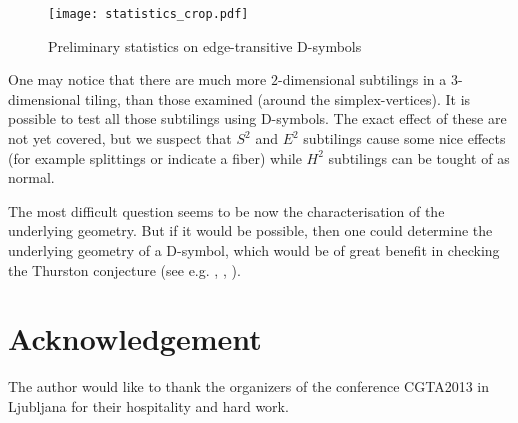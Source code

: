 \documentclass[12pt,a4paper]{article}
\numberwithin{equation}{section}
\theoremstyle{plain}%
\theoremstyle{definition}
\theoremstyle{remark}
\begin{document}
\begin{figure}
  \caption{\label{fig:stat} Preliminary statistics on edge-transitive D-symbols}
  \center
  \texttt{[image: statistics\_crop.pdf]}
\end{figure}


One may notice that there are much more $2$-dimensional subtilings in a
$3$-dimensional tiling, than those examined (around the simplex-vertices). It
is possible to test all those subtilings using D-symbols. The exact
effect of these are not yet covered, but we suspect that $S^2$ and $E^2$
subtilings cause some nice effects (for example splittings or indicate a fiber)
while $H^2$ subtilings can be tought of as normal.

The most difficult question seems to be now the characterisation of
the underlying geometry. But if it would be possible, then one could determine
the underlying geometry of a D-symbol, which would be of great benefit in checking
the Thurston conjecture (see e.g. \cite{Du88}, \cite{M11}, \cite{T82}).

\section{Acknowledgement}
The author would like to thank the organizers of the conference CGTA2013 in
Ljubljana for their hospitality and hard work.

\nocite{DHM93,D87,Du88,H93,LM90,Ma67,M94,T82,VS93,F94,M11,DDH98,K11,LMS94}


\end{document}
